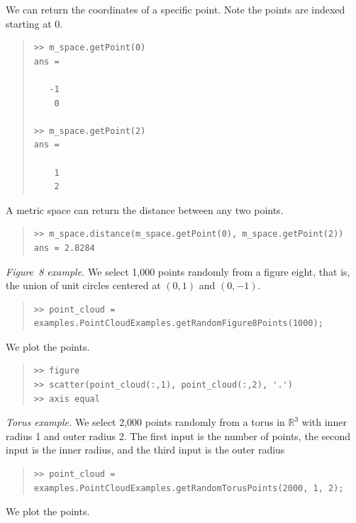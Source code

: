 \documentclass[amscd, amssymb, verbatim]{amsart}[12pt]
\theoremstyle{remark}
\theoremstyle{remark}
\theoremstyle{remark}
\newcommand{\R}{\mathbb{R}}
\begin{document}
We can return the coordinates of a specific point. Note the points are indexed starting at 0.

\begin{quote} \begin{verbatim}
>> m_space.getPoint(0)
ans = 

   -1
    0
   
>> m_space.getPoint(2)
ans = 

    1
    2
\end{verbatim} \end{quote}

A metric space can return the distance between any two points.

\begin{quote} \begin{verbatim}
>> m_space.distance(m_space.getPoint(0), m_space.getPoint(2))
ans = 2.8284
\end{verbatim} \end{quote}

{\em Figure~8 example.} We select 1,000 points randomly from a figure eight, that is, the union of unit circles centered at $(0,1)$ and $(0,-1)$.

\begin{quote} \begin{verbatim}
>> point_cloud = examples.PointCloudExamples.getRandomFigure8Points(1000);
\end{verbatim} \end{quote}

We plot the points.

\begin{quote} \begin{verbatim}
>> figure
>> scatter(point_cloud(:,1), point_cloud(:,2), '.')
>> axis equal
\end{verbatim} \end{quote}

{\em Torus example.} We select 2,000 points randomly from a torus in $\R^3$ with inner radius 1 and outer radius 2. The first input is the number of points, the second input is the inner radius, and the third input is the outer radius

\begin{quote} \begin{verbatim}
>> point_cloud = examples.PointCloudExamples.getRandomTorusPoints(2000, 1, 2);
\end{verbatim} \end{quote}

We plot the points.
\end{document}

